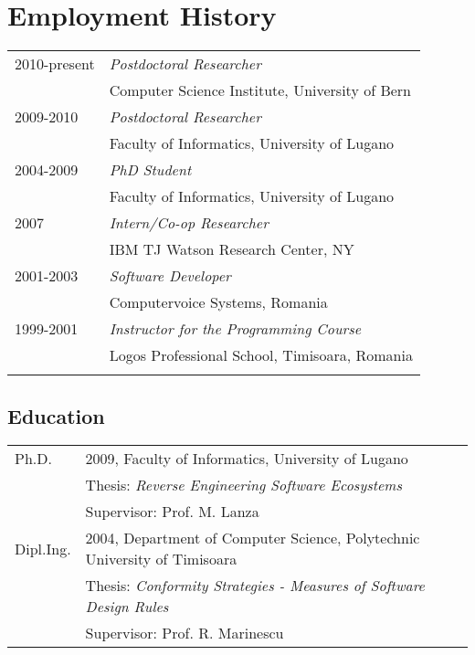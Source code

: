 \section{Employment History}

\begin{tabular}{p{3.5cm}l}
2010-present	& \emph{Postdoctoral Researcher} \\
				& Computer Science Institute, University of Bern \\
2009-2010		& \emph{Postdoctoral Researcher} \\
				& Faculty of Informatics, University of Lugano\\
2004-2009		& \emph{PhD Student} \\
				& Faculty of Informatics, University of Lugano\\
2007			& \emph{Intern/Co-op Researcher} \\
				& IBM TJ Watson Research Center, NY\\
2001-2003		& \emph{Software Developer} \\
				& Computervoice Systems, Romania\\
1999-2001		& \emph{Instructor for the Programming Course} \\
				& Logos Professional School, Timisoara, Romania\\
\longcv{
}
\end{tabular}

\subsection*{Education}
\begin{tabular}{p{3cm}p{12cm}}
Ph.D.	& 2009, Faculty of Informatics, University of Lugano\\
		& Thesis: \emph{Reverse Engineering Software Ecosystems} \\
		& Supervisor: Prof. M. Lanza\\
Dipl.Ing.	& 2004, Department of Computer Science, Polytechnic University of Timisoara\\
		& Thesis: \emph{Conformity Strategies - Measures of Software Design Rules}\\
		& Supervisor: Prof. R. Marinescu \\
\end{tabular}
